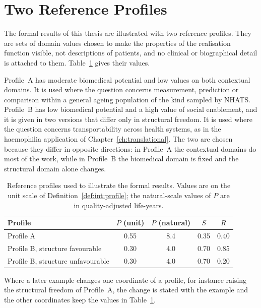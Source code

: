 \section{Two Reference Profiles}
\label{sec:intro-cases}

The formal results of this thesis are illustrated with two reference profiles. They are sets of domain values chosen to make the properties of the realisation function visible, not descriptions of patients, and no clinical or biographical detail is attached to them. Table~\ref{tab:profiles} gives their values.

Profile~A has moderate biomedical potential and low values on both contextual domains. It is used where the question concerns measurement, prediction or comparison within a general ageing population of the kind sampled by NHATS. Profile~B has low biomedical potential and a high value of social enablement, and it is given in two versions that differ only in structural freedom. It is used where the question concerns transportability across health systems, as in the haemophilia application of Chapter~\ref{ch:translational}. The two are chosen because they differ in opposite directions: in Profile~A the contextual domains do most of the work, while in Profile~B the biomedical domain is fixed and the structural domain alone changes.

\begin{table}[htbp]
\centering
\caption{Reference profiles used to illustrate the formal results. Values are on the unit scale of Definition~\ref{def:int:profile}; the natural-scale values of $P$ are in quality-adjusted life-years.}
\label{tab:profiles}
\footnotesize
\renewcommand{\arraystretch}{1.2}
\begin{tabular}{p{4.2cm} c c c c}
\toprule
\textbf{Profile} & $P$ (unit) & $P$ (natural) & $S$ & $R$ \\
\midrule
Profile A & 0.55 & 8.4 & 0.35 & 0.40 \\
Profile B, structure favourable & 0.30 & 4.0 & 0.70 & 0.85 \\
Profile B, structure unfavourable & 0.30 & 4.0 & 0.70 & 0.20 \\
\bottomrule
\end{tabular}
\end{table}

Where a later example changes one coordinate of a profile, for instance raising the structural freedom of Profile~A, the change is stated with the example and the other coordinates keep the values in Table~\ref{tab:profiles}.

